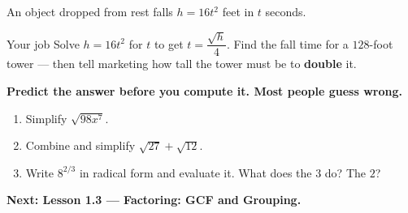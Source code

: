 \documentclass[aspectratio=169, 11pt]{beamer}
\begin{document}
\begin{frame}[t, plain]
  An object dropped from rest falls $h=16t^2$ feet in $t$ seconds.
  \begin{block}{Your job}
    Solve $h=16t^2$ for $t$ to get $t=\dfrac{\sqrt h}{4}$. Find the fall time for a $128$-foot
    tower --- then tell marketing how tall the tower must be to \textbf{double} it.
  \end{block}
  \vspace{0.2cm}

  {\color{goldacc}\bfseries Predict the answer before you compute it. Most people guess wrong.}
\end{frame}

\begin{frame}[t, plain]
  \begin{enumerate}
    \setlength{\itemsep}{0.35cm}
    \item Simplify $\sqrt{98x^7}$.
    \item Combine and simplify $\sqrt{27}+\sqrt{12}$.
    \item Write $8^{2/3}$ in radical form and evaluate it. What does the $3$ do? The $2$?
  \end{enumerate}
  \vspace{0.3cm}
  {\color{royal}\bfseries Next: Lesson 1.3 --- Factoring: GCF and Grouping.}
\end{frame}
\end{document}
